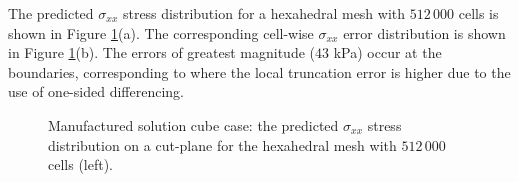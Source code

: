 \documentclass[sn-mathphys,Numbered]{sn-jnl}%
\begin{document}
The predicted $\sigma_{xx}$ stress distribution for a hexahedral mesh with $512\,000$ cells is shown in Figure \ref{fig:mms_stress}(a).
The corresponding cell-wise $\sigma_{xx}$ error distribution is shown in Figure \ref{fig:mms_stress}(b).
The errors of greatest magnitude ($43$ kPa) occur at the boundaries, corresponding to where the local truncation error is higher due to the use of one-sided differencing.
\begin{figure}[htbp]
	\centering
	\caption{Manufactured solution cube case: the predicted $\sigma_{xx}$ stress distribution on a cut-plane for the hexahedral mesh with $512\,000$ cells (left).}
	\label{fig:mms_stress}
\end{figure}
\end{document}
